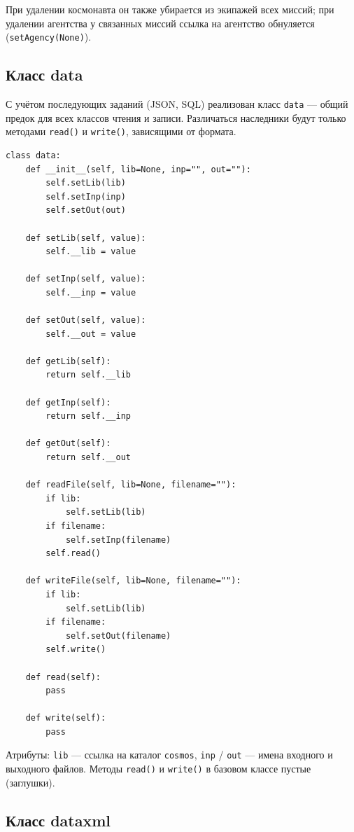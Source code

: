 \documentclass[a4paper,14pt]{extarticle}
\begin{document}
При удалении космонавта он также убирается из экипажей всех миссий; при удалении агентства у связанных миссий ссылка на агентство обнуляется (\texttt{setAgency(None)}).

\subsection{Класс data}

С учётом последующих заданий (JSON, SQL) реализован класс \texttt{data} --- общий предок для всех классов чтения и записи. Различаться наследники будут только методами \texttt{read()} и \texttt{write()}, зависящими от формата.

\begin{lstlisting}[caption={Модуль \texttt{data.py}}]
class data:
    def __init__(self, lib=None, inp="", out=""):
        self.setLib(lib)
        self.setInp(inp)
        self.setOut(out)

    def setLib(self, value):
        self.__lib = value

    def setInp(self, value):
        self.__inp = value

    def setOut(self, value):
        self.__out = value

    def getLib(self):
        return self.__lib

    def getInp(self):
        return self.__inp

    def getOut(self):
        return self.__out

    def readFile(self, lib=None, filename=""):
        if lib:
            self.setLib(lib)
        if filename:
            self.setInp(filename)
        self.read()

    def writeFile(self, lib=None, filename=""):
        if lib:
            self.setLib(lib)
        if filename:
            self.setOut(filename)
        self.write()

    def read(self):
        pass

    def write(self):
        pass
\end{lstlisting}

Атрибуты: \texttt{lib} --- ссылка на каталог \texttt{cosmos}, \texttt{inp} / \texttt{out} --- имена входного и выходного файлов. Методы \texttt{read()} и \texttt{write()} в базовом классе пустые (заглушки).

\subsection{Класс dataxml}
\end{document}
